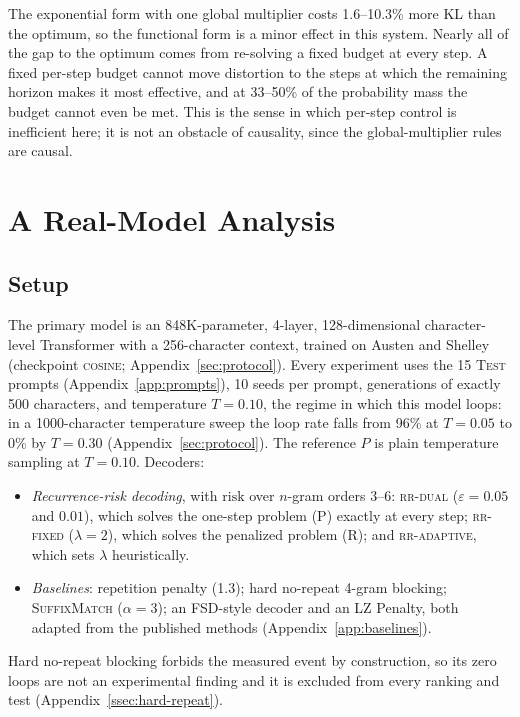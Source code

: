 \documentclass[11pt]{article}
\newcommand{\risk}{\mathrm{risk}}
\begin{document}
The exponential form with one global multiplier costs 1.6--10.3\% more KL than the optimum, so the functional form is a minor effect in this system. Nearly all of the gap to the optimum comes from re-solving a fixed budget at every step. A fixed per-step budget cannot move distortion to the steps at which the remaining horizon makes it most effective, and at 33--50\% of the probability mass the budget cannot even be met. This is the sense in which per-step control is inefficient here; it is not an obstacle of causality, since the global-multiplier rules are causal.

\section{A Real-Model Analysis}
\label{sec:realmodel}

\subsection{Setup}
\label{ssec:setup}
The primary model is an 848K-parameter, 4-layer, 128-dimensional character-level Transformer with a 256-character context, trained on Austen and Shelley (checkpoint \textsc{cosine}; Appendix~\ref{sec:protocol}). Every experiment uses the 15 \textsc{Test} prompts (Appendix~\ref{app:prompts}), 10 seeds per prompt, generations of exactly 500 characters, and temperature $T{=}0.10$, the regime in which this model loops: in a 1000-character temperature sweep the loop rate falls from 96\% at $T{=}0.05$ to 0\% by $T{=}0.30$ (Appendix~\ref{sec:protocol}). The reference $P$ is plain temperature sampling at $T{=}0.10$. Decoders:
\begin{itemize}[leftmargin=*]
  \item \emph{Recurrence-risk decoding}, with $\risk$ over $n$-gram orders 3--6: \textsc{rr-dual} ($\varepsilon{=}0.05$ and $0.01$), which solves the one-step problem (P) exactly at every step; \textsc{rr-fixed} ($\lambda{=}2$), which solves the penalized problem (R); and \textsc{rr-adaptive}, which sets $\lambda$ heuristically.
  \item \emph{Baselines}: repetition penalty (1.3); hard no-repeat 4-gram blocking; \textsc{SuffixMatch} ($\alpha{=}3$); an FSD-style decoder and an LZ Penalty, both adapted from the published methods (Appendix~\ref{app:baselines}).
\end{itemize}
Hard no-repeat blocking forbids the measured event by construction, so its zero loops are not an experimental finding and it is excluded from every ranking and test (Appendix~\ref{ssec:hard-repeat}).
\end{document}
